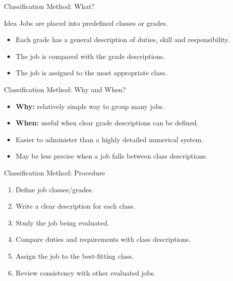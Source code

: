 \documentclass[aspectratio=169,10pt]{beamer}
\begin{document}
\begin{frame}{Classification Method: What?}
\begin{block}{Idea}
Jobs are placed into predefined classes or grades.
\end{block}
\begin{itemize}
  \item Each grade has a general description of duties, skill and responsibility.
  \item The job is compared with the grade descriptions.
  \item The job is assigned to the most appropriate class.
\end{itemize}
\end{frame}

\begin{frame}{Classification Method: Why and When?}
\begin{itemize}
  \item \textbf{Why:} relatively simple way to group many jobs.
  \item \textbf{When:} useful when clear grade descriptions can be defined.
  \item Easier to administer than a highly detailed numerical system.
  \item May be less precise when a job falls between class descriptions.
\end{itemize}
\end{frame}

\begin{frame}{Classification Method: Procedure}
\begin{enumerate}
  \item Define job classes/grades.
  \item Write a clear description for each class.
  \item Study the job being evaluated.
  \item Compare duties and requirements with class descriptions.
  \item Assign the job to the best-fitting class.
  \item Review consistency with other evaluated jobs.
\end{enumerate}
\end{frame}
\end{document}
